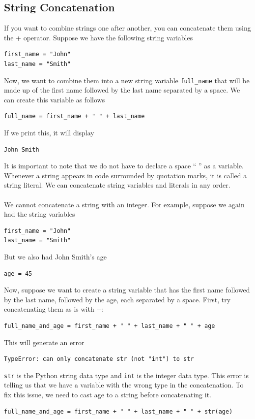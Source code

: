 \documentclass{article}
\begin{document}
\subsection{String Concatenation}
If you want to combine strings one after another, you can concatenate them using the + operator. Suppose we have the following string variables
\begin{verbatim}
first_name = "John"
last_name = "Smith"
\end{verbatim}
Now, we want to combine them into a new string variable \texttt{full\_name} that will be made up of the first name followed by the last name separated by a space. We can create this variable as follows
\begin{verbatim}
full_name = first_name + " " + last_name
\end{verbatim}
If we print this, it will display
\begin{verbatim}
John Smith
\end{verbatim}
It is important to note that we do not have to declare a space `` '' as a variable. Whenever a string appears in code surrounded by quotation marks, it is called a string literal. We can concatenate string variables and literals in any order.\\\\
We cannot concatenate a string with an integer. For example, suppose we again had the string variables
\begin{verbatim}
first_name = "John"
last_name = "Smith"
\end{verbatim}
But we also had John Smith's age
\begin{verbatim}
age = 45
\end{verbatim}
Now, suppose we want to create a string variable that has the first name followed by the last name, followed by the age, each separated by a space. First, try concatenating them as is with +:
\begin{verbatim}
full_name_and_age = first_name + " " + last_name + " " + age
\end{verbatim}
This will generate an error
\begin{verbatim}
TypeError: can only concatenate str (not "int") to str
\end{verbatim}
\texttt{str} is the Python string data type and \texttt{int} is the integer data type. This error is telling us that we have a variable with the wrong type in the concatenation. To fix this issue, we need to cast age to a string before concatenating it. 
\begin{verbatim}
full_name_and_age = first_name + " " + last_name + " " + str(age)
\end{verbatim}
\end{document}
